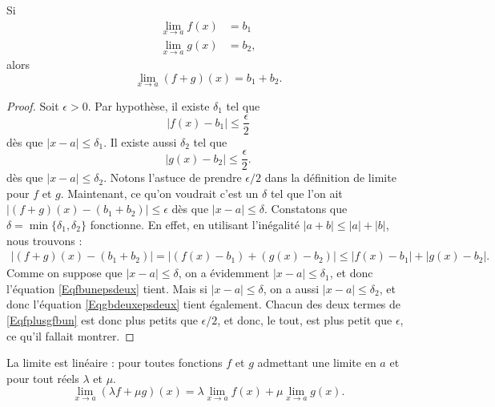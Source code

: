 \begin{theorem}     \label{ThoLimLin}
	Si
	\begin{subequations}
		\begin{align}
			\lim_{x\to a}f(x) & = b_1   \\
			\lim_{x\to a}g(x) & = b_2,
		\end{align}
	\end{subequations}
	alors
	\begin{equation}
		\lim_{x\to a}(f+g)(x)=b_1+b_2.
	\end{equation}
\end{theorem}

\begin{proof}
	Soit \( \epsilon>0\). Par hypothèse, il existe \( \delta_1\) tel que
	\begin{equation}    \label{Eqfbunepsdeux}
		| f(x)-b_1 |\leq \frac{ \epsilon }{ 2 }
	\end{equation}
	dès que \( | x-a |\leq\delta_1\). Il existe aussi \( \delta_2\) tel que
	\begin{equation}    \label{Eqgbdeuxepsdeux}
		| g(x)-b_2 |\leq \frac{ \epsilon }{ 2 }.
	\end{equation}
	dès que \( | x-a |\leq \delta_2\). Notons l'astuce de prendre \( \epsilon/2\) dans la définition de limite pour \( f\) et \( g\). Maintenant, ce qu'on voudrait c'est un \( \delta\) tel que l'on ait \( | (f+g)(x)-(b_1+b_2) |\leq \epsilon\) dès que \( | x-a |\leq \delta\). Constatons que \( \delta=\min\{ \delta_1,\delta_2 \}\) fonctionne. En effet, en utilisant l'inégalité \( | a+b |\leq | a |+| b |\), nous trouvons :
	\begin{align}
		| (f+g)(x)-(b_1+b_2) |=| (f(x)-b_1)+(g(x)-b_2) |
		\leq | f(x)-b_1 |+| g(x)-b_2 |.     \label{Eqfplusgfbun}
	\end{align}
	Comme on suppose que \( | x-a |\leq\delta\), on a évidemment \( | x-a |\leq\delta_1\), et donc l'équation \eqref{Eqfbunepsdeux} tient. Mais si \( | x-a |\leq\delta\), on a aussi \( | x-a |\leq\delta_2\), et donc l'équation  \eqref{Eqgbdeuxepsdeux} tient également. Chacun des deux termes de \eqref{Eqfplusgfbun} est donc plus petits que \( \epsilon/2\), et donc, le tout, est plus petit que \( \epsilon\), ce qu'il fallait montrer.
\end{proof}

\begin{proposition}     \label{PROPooVLBWooVttvFK}
	La limite est linéaire : pour toutes fonctions \( f\) et \( g\) admettant une limite en \( a\) et pour tout réels \( \lambda\) et \( \mu\).
	\begin{equation}
		\lim_{x\to a} (\lambda f+\mu g)(x)=\lambda\lim_{x\to a} f(x)+\mu\lim_{x\to a} g(x).
	\end{equation}
\end{proposition}

